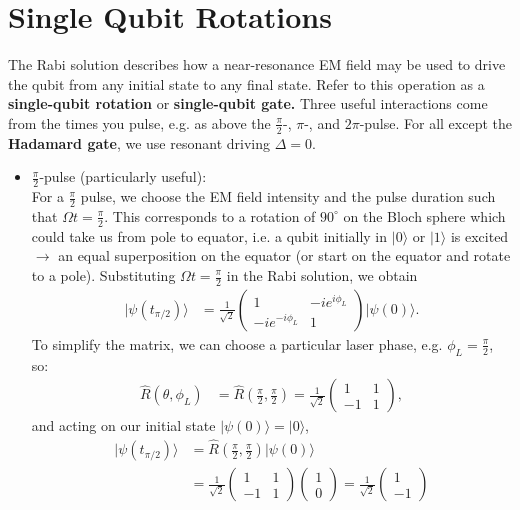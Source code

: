 \documentclass[a4paper, 11pt, normalem]{report}
\begin{document}
\section{Single Qubit Rotations}
The Rabi solution describes how a near-resonance EM field may be used to drive the qubit from any initial state to any final state.
Refer to this operation as a \textbf{single-qubit rotation} or \textbf{single-qubit gate.}
Three useful interactions come from the times you pulse, e.g. as above the $\frac{\pi}{2}$-, $\pi$-, and $2\pi$-pulse.
For all except the \textbf{Hadamard gate}, we use resonant driving $\Delta=0$.
\begin{itemize}
    \item $\frac{\pi}{2}$-pulse (particularly useful):\\
        For a $\frac{\pi}{2}$ pulse, we choose the EM field intensity and the pulse duration such that $\Omega t=\frac{\pi}{2}$.
        This corresponds to a rotation of $90^\circ$ on the Bloch sphere which could take us from pole to equator, i.e. a qubit initially in $|0\rangle$ or $|1\rangle$ is excited $\to$ an equal superposition on the equator (or start on the equator and rotate to a pole).
        Substituting $\Omega t=\frac{\pi}{2}$ in the Rabi solution, we obtain
        \begin{align}
            |\psi(t_{\pi/2})\rangle &= \frac{1}{\sqrt{2}} \begin{pmatrix} 1 & -ie^{i\phi_L} \\ -ie^{-i\phi_L} & 1\end{pmatrix}|\psi(0)\rangle.
        \end{align}
        To simplify the matrix, we can choose a particular laser phase, e.g. $\phi_L=\frac{\pi}{2}$, so:
        \begin{align}
            \hat{R}(\theta,\phi_L) &= \hat{R}\left(\frac{\pi}{2},\frac{\pi}{2}\right) = \frac{1}{\sqrt{2}}\begin{pmatrix}1 & 1 \\ -1 & 1\end{pmatrix},
        \end{align}
        and acting on our initial state $|\psi(0)\rangle=|0\rangle$,
        \begin{align}
            |\psi(t_{\pi/2})\rangle &= \hat{R}\left(\frac{\pi}{2},\frac{\pi}{2}\right)|\psi(0)\rangle \\
                                    &= \frac{1}{\sqrt{2}}\begin{pmatrix}1&1\\-1&1\end{pmatrix}\begin{pmatrix}1\\0\end{pmatrix} = \frac{1}{\sqrt{2}}\begin{pmatrix}1\\-1\end{pmatrix} \\

\end{align}
\end{itemize}
\end{document}

